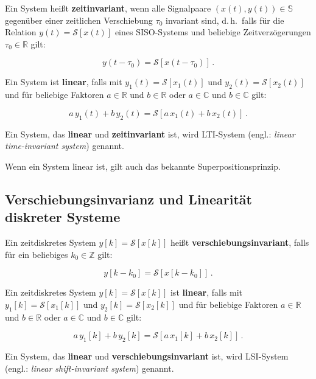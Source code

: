 \begin{definition}
Ein System heißt \textbf{zeitinvariant}, wenn alle Signalpaare $(x(t), y(t)) \in \mathbb{S}$ gegenüber einer zeitlichen Verschiebung $\tau_0$ invariant sind, d.\,h.\ falls für die Relation $y(t) = \mathcal{S}[x(t)]$ eines SISO-Systems und beliebige Zeitverzögerungen $\tau_0 \in \mathbb{R}$ gilt:

$$
y(t - \tau_0) = \mathcal{S}[x(t - \tau_0)]\,.
$$

Ein System ist \textbf{linear}, falls mit $y_1(t) = \mathcal{S}[x_1(t)]$ und $y_2(t) = \mathcal{S}[x_2(t)]$ und für beliebige Faktoren $a \in \mathbb{R}$ und $b \in \mathbb{R}$ oder $a \in \mathbb{C}$ und $b \in \mathbb{C}$ gilt:

$$
a\,y_1(t) + b\,y_2(t) = \mathcal{S}[a\,x_1(t) + b\,x_2(t)]\,.
$$

Ein System, das \textbf{linear} und \textbf{zeitinvariant} ist, wird LTI-System (engl.: \textit{linear time-invariant system}) genannt.
\end{definition}

Wenn ein System linear ist, gilt auch das bekannte Superpositionsprinzip.

\subsection{Verschiebungsinvarianz und Linearität diskreter Systeme}
\label{sec:verschiebungsinvarianz}

\begin{definition}
Ein zeitdiskretes System $y[k] = \mathcal{S}[x[k]]$ heißt \textbf{verschiebungsinvariant}, falls für ein beliebiges $k_0 \in \mathbb{Z}$ gilt:

$$
y[k - k_0] = \mathcal{S}[x[k - k_0]]\,.
$$

Ein zeitdiskretes System $y[k] = \mathcal{S}[x[k]]$ ist \textbf{linear}, falls mit $y_1[k] = \mathcal{S}[x_1[k]]$ und $y_2[k] = \mathcal{S}[x_2[k]]$ und für beliebige Faktoren $a \in \mathbb{R}$ und $b \in \mathbb{R}$ oder $a \in \mathbb{C}$ und $b \in \mathbb{C}$ gilt:

$$
a\,y_1[k] + b\,y_2[k] = \mathcal{S}[a\,x_1[k] + b\,x_2[k]]\,.
$$

Ein System, das \textbf{linear} und \textbf{verschiebungsinvariant} ist, wird LSI-System (engl.: \textit{linear shift-invariant system}) genannt.
\end{definition}

